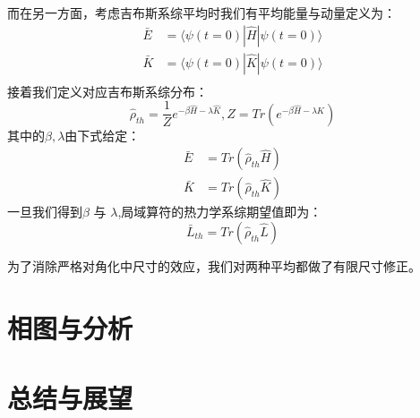 而在另一方面，考虑吉布斯系综平均时我们有平均能量与动量定义为：
\begin{equation}
\begin{split}
 \bar{E} &= \langle\psi(t=0)|\hat{H}|\psi(t=0)\rangle \\
 \bar{K} &= \langle\psi(t=0)|\hat{K}|\psi(t=0)\rangle\\
\end{split}
\end{equation}
接着我们定义对应吉布斯系综分布：
\begin{equation}
\hat{\rho}_{th} = \frac{1}{Z}e^{-\beta\hat{H}-\lambda\hat{K}}, Z = Tr(e^{-\beta\hat{H}-\lambda\hat{K}})
\end{equation}
其中的$\beta,\lambda$由下式给定：
\begin{equation}
\begin{split}
	\bar{E} &= Tr(\hat{\rho}_{th}\hat{H} ) \\
	\bar{K} &= Tr(\hat{\rho}_{th}\hat{K})
\end{split}
\end{equation}
一旦我们得到$\beta$ 与 $\lambda$,局域算符的热力学系综期望值即为：
\begin{equation}
	\bar{L}_{th} = Tr(\hat{\rho}_{th}\hat{L})
\end{equation}

为了消除严格对角化中尺寸的效应，我们对两种平均都做了有限尺寸修正。

\section{相图与分析}

\section{总结与展望}


